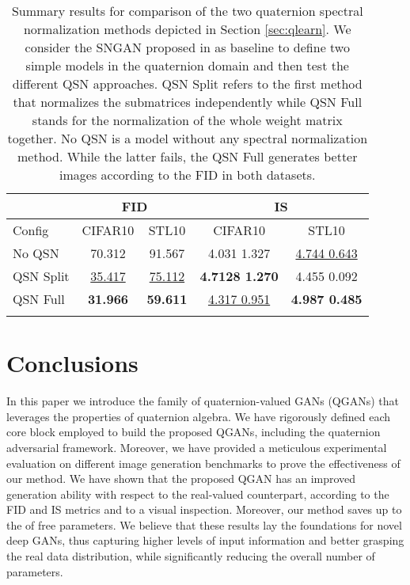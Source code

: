 \documentclass[graybox]{svmult}
\begin{document}
\begin{table}[t]
\caption{Summary results for comparison of the two quaternion spectral normalization methods depicted in Section \ref{sec:qlearn}. We consider the SNGAN proposed in \cite{Miyato2018SpectralNF} as baseline to define two simple models in the quaternion domain and then test the different QSN approaches. QSN Split refers to the first method that normalizes the submatrices independently while QSN Full stands for the normalization of the whole weight matrix together. No QSN is a model without any spectral normalization method. While the latter fails, the QSN Full generates better images according to the FID in both datasets.}
\centering
\begin{tabular}{@{}lcccc@{}}
\hline\noalign{\smallskip}
          & \multicolumn{2}{c}{FID }           & \multicolumn{2}{c}{IS }                              \\ \midrule
Config    & CIFAR10         & STL10           & CIFAR10                   & STL10                   \\
No QSN    & 70.312          &  91.567         & 4.031  1.327 &  \underline{4.744  0.643}          \\
QSN Split & \underline{35.417}          & \underline{75.112}          & \textbf{4.7128  1.270} & 4.455  0.092           \\
QSN Full  & \textbf{31.966} & \textbf{59.611} & \underline{4.317  0.951}            & \textbf{4.987  0.485} \\ 
\noalign{\smallskip}\hline\noalign{\smallskip}
\end{tabular}
\label{tab:qsn_tab}
\end{table}

\section{Conclusions}
\label{sec:conc}
\noindent In this paper we introduce the family of quaternion-valued GANs (QGANs) that leverages the properties of quaternion algebra. We have rigorously defined each core block employed to build the proposed QGANs, including the quaternion adversarial framework. Moreover, we have provided a meticulous experimental evaluation on different image generation benchmarks to prove the effectiveness of our method. We have shown that the proposed QGAN has an improved generation ability with respect to the real-valued counterpart, according to the FID and IS metrics and to a visual inspection. Moreover, our method saves up to the  of free parameters. We believe that these results lay the foundations for novel deep GANs, thus capturing higher levels of input information and better grasping the real data distribution, while significantly reducing the overall number of parameters.



\end{document}
